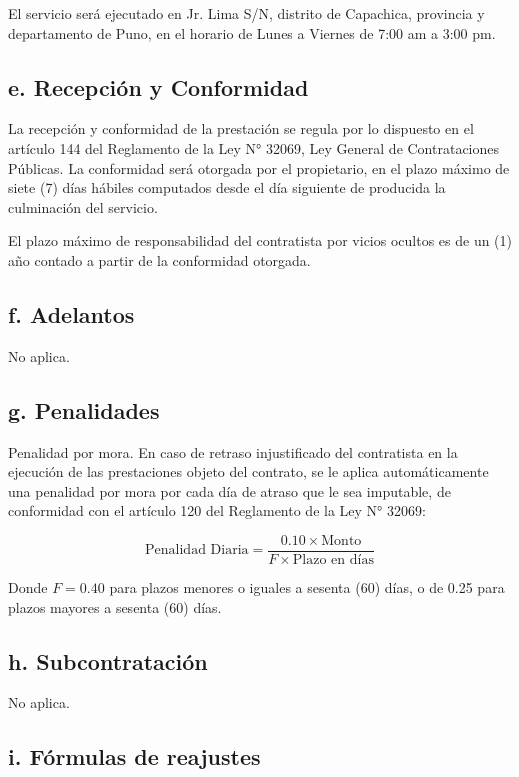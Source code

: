 \documentclass[12pt,a4paper]{article}
\begin{document}
El servicio será ejecutado en Jr. Lima S/N, distrito de Capachica, provincia y departamento de Puno, en el horario de Lunes a Viernes de 7:00 am a 3:00 pm.

\subsection*{e. Recepción y Conformidad}

La recepción y conformidad de la prestación se regula por lo dispuesto en el artículo 144 del Reglamento de la Ley N° 32069, Ley General de Contrataciones Públicas. La conformidad será otorgada por el propietario, en el plazo máximo de siete (7) días hábiles computados desde el día siguiente de producida la culminación del servicio.

El plazo máximo de responsabilidad del contratista por vicios ocultos es de un (1) año contado a partir de la conformidad otorgada.

\subsection*{f. Adelantos}

No aplica.

\subsection*{g. Penalidades}

Penalidad por mora. En caso de retraso injustificado del contratista en la ejecución de las prestaciones objeto del contrato, se le aplica automáticamente una penalidad por mora por cada día de atraso que le sea imputable, de conformidad con el artículo 120 del Reglamento de la Ley N° 32069:

\[
\text{Penalidad Diaria} = \frac{0.10 \times \text{Monto}}{F \times \text{Plazo en días}}
\]

Donde $F = 0.40$ para plazos menores o iguales a sesenta (60) días, o de 0.25 para plazos mayores a sesenta (60) días.

\subsection*{h. Subcontratación}

No aplica.

\subsection*{i. Fórmulas de reajustes}
\end{document}
